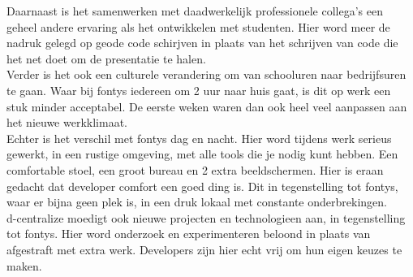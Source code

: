 Daarnaast is het samenwerken met daadwerkelijk professionele collega's een geheel andere ervaring als het ontwikkelen met studenten. Hier word meer de nadruk gelegd op geode code schirjven in plaats van het schrijven van code die het net doet om de presentatie te halen. \\ 

Verder is het ook een culturele verandering om van schooluren naar bedrijfsuren te gaan. Waar bij fontys iedereen om 2 uur naar huis gaat, is dit op werk een stuk minder acceptabel. De eerste weken waren dan ook heel veel aanpassen aan het nieuwe werkklimaat. \\

Echter is het verschil met fontys dag en nacht. Hier word tijdens werk serieus gewerkt, in een rustige omgeving, met alle tools die je nodig kunt hebben. Een comfortable stoel, een groot bureau en 2 extra beeldschermen. Hier is eraan gedacht dat developer comfort een goed ding is. Dit in tegenstelling tot fontys, waar er bijna geen plek is, in een druk lokaal met constante onderbrekingen. \\

d-centralize moedigt ook nieuwe projecten en technologieen aan, in tegenstelling tot fontys. Hier word onderzoek en experimenteren beloond in plaats van afgestraft met extra werk. Developers zijn hier echt vrij om hun eigen keuzes te maken.